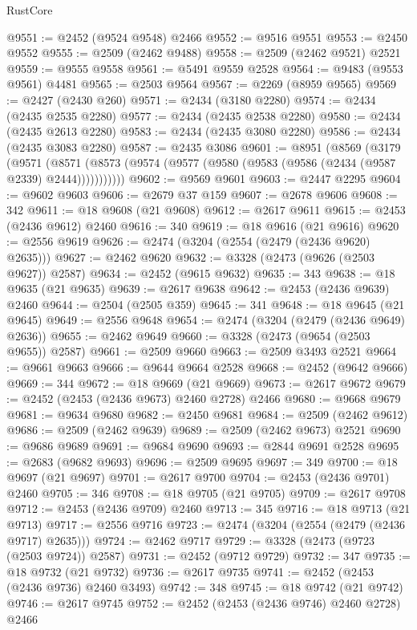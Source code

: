 \begin{lexlean}{RustCore}
\begin{coremodule}
@9551 := @2452 (@9524 @9548) @2466
@9552 := @9516 @9551
@9553 := @2450 @9552
@9555 := @2509 (@2462 @9488)
@9558 := @2509 (@2462 @9521) @2521
@9559 := @9555 @9558
@9561 := @5491 @9559 @2528
@9564 := @9483 (@9553 @9561) @4481
@9565 := @2503 @9564
@9567 := @2269 (@8959 @9565)
@9569 := @2427 (@2430 @260)
@9571 := @2434 (@3180 @2280)
@9574 := @2434 (@2435 @2535 @2280)
@9577 := @2434 (@2435 @2538 @2280)
@9580 := @2434 (@2435 @2613 @2280)
@9583 := @2434 (@2435 @3080 @2280)
@9586 := @2434 (@2435 @3083 @2280)
@9587 := @2435 @3086
@9601 := @8951
    (@8569
      (@3179
        (@9571
          (@8571 (@8573 (@9574 (@9577 (@9580 (@9583 (@9586 (@2434 (@9587 @2339) @2444)))))))))))
@9602 := @9569 @9601
@9603 := @2447 @2295
@9604 := @9602 @9603
@9606 := @2679 @37 @159
@9607 := @2678 @9606
@9608 := 342
@9611 := @18 @9608 (@21 @9608)
@9612 := @2617 @9611
@9615 := @2453 (@2436 @9612) @2460
@9616 := 340
@9619 := @18 @9616 (@21 @9616)
@9620 := @2556 @9619
@9626 := @2474 (@3204 (@2554 (@2479 (@2436 @9620) @2635)))
@9627 := @2462 @9620
@9632 := @3328 (@2473 (@9626 (@2503 @9627)) @2587)
@9634 := @2452 (@9615 @9632)
@9635 := 343
@9638 := @18 @9635 (@21 @9635)
@9639 := @2617 @9638
@9642 := @2453 (@2436 @9639) @2460
@9644 := @2504 (@2505 @359)
@9645 := 341
@9648 := @18 @9645 (@21 @9645)
@9649 := @2556 @9648
@9654 := @2474 (@3204 (@2479 (@2436 @9649) @2636))
@9655 := @2462 @9649
@9660 := @3328 (@2473 (@9654 (@2503 @9655)) @2587)
@9661 := @2509 @9660
@9663 := @2509 @3493 @2521
@9664 := @9661 @9663
@9666 := @9644 @9664 @2528
@9668 := @2452 (@9642 @9666)
@9669 := 344
@9672 := @18 @9669 (@21 @9669)
@9673 := @2617 @9672
@9679 := @2452 (@2453 (@2436 @9673) @2460 @2728) @2466
@9680 := @9668 @9679
@9681 := @9634 @9680
@9682 := @2450 @9681
@9684 := @2509 (@2462 @9612)
@9686 := @2509 (@2462 @9639)
@9689 := @2509 (@2462 @9673) @2521
@9690 := @9686 @9689
@9691 := @9684 @9690
@9693 := @2844 @9691 @2528
@9695 := @2683 (@9682 @9693)
@9696 := @2509 @9695
@9697 := 349
@9700 := @18 @9697 (@21 @9697)
@9701 := @2617 @9700
@9704 := @2453 (@2436 @9701) @2460
@9705 := 346
@9708 := @18 @9705 (@21 @9705)
@9709 := @2617 @9708
@9712 := @2453 (@2436 @9709) @2460
@9713 := 345
@9716 := @18 @9713 (@21 @9713)
@9717 := @2556 @9716
@9723 := @2474 (@3204 (@2554 (@2479 (@2436 @9717) @2635)))
@9724 := @2462 @9717
@9729 := @3328 (@2473 (@9723 (@2503 @9724)) @2587)
@9731 := @2452 (@9712 @9729)
@9732 := 347
@9735 := @18 @9732 (@21 @9732)
@9736 := @2617 @9735
@9741 := @2452 (@2453 (@2436 @9736) @2460 @3493)
@9742 := 348
@9745 := @18 @9742 (@21 @9742)
@9746 := @2617 @9745
@9752 := @2452 (@2453 (@2436 @9746) @2460 @2728) @2466

\end{coremodule}
\end{lexlean}
